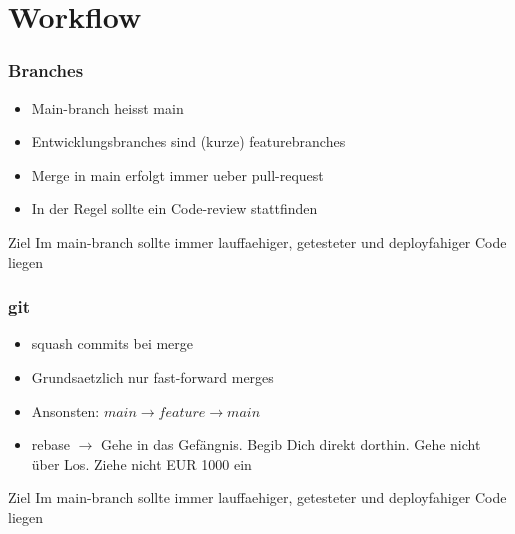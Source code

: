 \section{Workflow}
\begin{frame}
    \frametitle{Branches}
    \begin{itemize}
    \item Main-branch heisst main
    \item Entwicklungsbranches sind (kurze) featurebranches
    \item Merge in main erfolgt immer ueber pull-request
    \item In der Regel sollte ein Code-review stattfinden
    \end{itemize}
    \begin{block}{Ziel}
      Im main-branch sollte immer lauffaehiger, getesteter und deployfahiger Code liegen
      \end{block}
  \end{frame}

  \begin{frame}
    \frametitle{git}
    \begin{itemize}
    \item squash commits bei merge
    \item Grundsaetzlich nur fast-forward merges
    \item Ansonsten: $ main  \rightarrow feature \rightarrow main $
    \item rebase $\rightarrow$ Gehe in das Gefängnis. Begib Dich direkt dorthin. Gehe nicht über Los. Ziehe nicht EUR 1000 ein 
    \end{itemize}
    \begin{block}{Ziel}
      Im main-branch sollte immer lauffaehiger, getesteter und deployfahiger Code liegen
      \end{block}
    \end{frame}